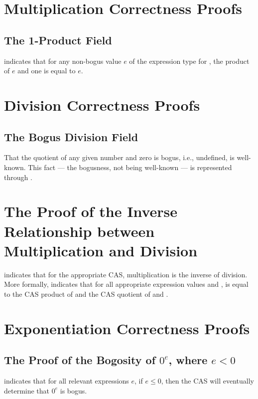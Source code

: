 \documentclass{report}
\begin{document}
\section{Multiplication Correctness Proofs}

\subsection{The 1-Product Field}
  indicates that for any non-bogus value \(e\) of the expression type for , the product of \(e\) and one is equal to \(e\).

\section{Division Correctness Proofs}

\subsection{The Bogus Division Field}
That the quotient of any given number and zero is bogus, i.e., undefined, is well-known.  This fact --- the bogusness, not being well-known --- is represented through .

\section{The Proof of the Inverse Relationship between Multiplication and Division}
 indicates that for the appropriate CAS, multiplication is the inverse of division.  More formally,   indicates that for all appropriate expression values  and ,  is equal to the  CAS product of  and the  CAS quotient of  and .

\section{Exponentiation Correctness Proofs}

\subsection{The Proof of the Bogosity of \(0^e\), where \(e < 0\)}
  indicates that for all relevant expressions \(e\), if \(e \leq 0\), then the  CAS will eventually determine that \(0^e\) is bogus.
\end{document}
